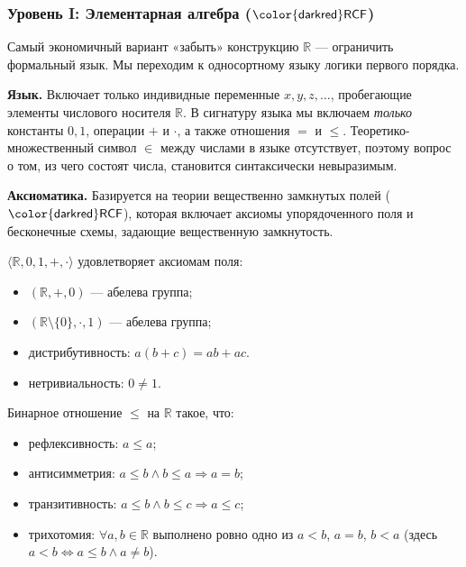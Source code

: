 \documentclass[11pt, a4paper]{extarticle}
\newcommand{\R}{{\mathbb R}}
\renewcommand{\le}{\leqslant}
\newcommand{\RCF}{\ifmmode \mathsf{\color{darkred}RCF}\else ${\mathsf{\color{darkred}RCF}}$\fi\xspace}
\begin{document}
\subsubsection{Уровень I: Элементарная алгебра (\RCF)}

Самый экономичный вариант «забыть» конструкцию $\R$ --- ограничить формальный язык. Мы переходим к односортному языку логики первого порядка.

\smallskip\noindent\textbf{Язык.} 
Включает только индивидные переменные $x, y, z, \ldots$, пробегающие элементы числового носителя $\R$.
В сигнатуру языка мы включаем \emph{только} константы $0, 1$, операции $+$ и $\cdot$, а также отношения $=$ и $\le$. Теоретико-множественный символ $\in$ между числами в языке отсутствует, поэтому вопрос о том, из чего состоят числа, становится синтаксически невыразимым.

\smallskip\noindent\textbf{Аксиоматика.} 
Базируется на теории вещественно замкнутых полей (\RCF), которая включает аксиомы упорядоченного поля и бесконечные схемы, задающие вещественную замкнутость.

\begin{axiom}[Поле]\label{ax:field}
$\langle \R, 0, 1, +, \cdot \rangle$ удовлетворяет аксиомам поля:
\begin{itemize}
    \item $(\R, +, 0)$ --- абелева группа;
    \item $(\R \setminus \{0\}, \cdot, 1)$ --- абелева группа;
    \item дистрибутивность: $a(b+c) = ab + ac$.
    \item нетривиальность: $0 \neq 1$.
\end{itemize}
\end{axiom}

\begin{axiom}\label{ax:linear}
Бинарное отношение $\le$ на $\R$ такое, что:
\begin{itemize}
    \item рефлексивность: $a \le a$;
    \item антисимметрия: $a \le b \wedge b \le a \Rightarrow a = b$;
    \item транзитивность: $a \le b \wedge b \le c \Rightarrow a \le c$;
    \item трихотомия: $\forall a, b \in \R$ выполнено ровно одно из $a < b$, $a = b$, $b < a$ (здесь $a < b \iff a \le b \wedge a \neq b$).
\end{itemize}
\end{axiom}
\end{document}
